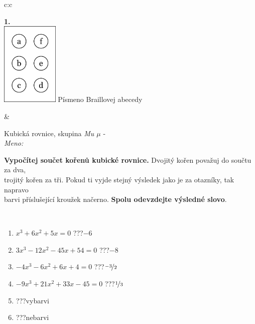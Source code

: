 \documentclass[10pt]{report}
\begin{document}
\begin{tabular}{c:c}
\begin{minipage}[c][104.5mm][t]{0.5\linewidth}
\begin{center}
\begin{minipage}{0.20\linewidth}
\begin{center}
{\Huge\bfseries 1.} \\[2mm]
\includegraphics[height=40mm]{../images/braille.png}
{\small Písmeno Braillovej abecedy}
\end{center}
\end{minipage}
\end{center}
\end{minipage}
&
\begin{minipage}[c][104.5mm][t]{0.5\linewidth}
\begin{center}
\vspace{7mm}
{\huge Kubická rovnice, skupina \textit{Mu $\mu$} -}\\[5mm]
\textit{Meno:}\phantom{xxxxxxxxxxxxxxxxxxxxxxxxxxxxxxxxxxxxxxxxxxxxxxxxxxxxxxxxxxxxxxxxx}\\[5mm]
\begin{minipage}{0.95\linewidth}
\textbf{Vypočítej součet kořenů kubické rovnice.} Dvojitý kořen považuj do součtu za dva,\\trojitý kořen za tři. Pokud ti vyjde stejný výsledek jako je za otazníky, tak napravo\\barvi příslušející kroužek načerno. \textbf{Spolu odevzdejte výsledné slovo}.
\end{minipage}
\\[1mm]
\begin{minipage}{0.79\linewidth}
\begin{center}
\begin{varwidth}{\linewidth}
\begin{enumerate}
\Large
\item $x^3+6x^2+5x=0$\quad \dotfill\; ???\;\dotfill \quad $-6$
\item $3x^3-12x^2-45x+54=0$\quad \dotfill\; ???\;\dotfill \quad $-8$
\item $-4x^3-6x^2+6x+4=0$\quad \dotfill\; ???\;\dotfill \quad $\nicefrac{-3}{2}$
\item $-9x^3+21x^2+33x-45=0$\quad \dotfill\; ???\;\dotfill \quad $\nicefrac{1}{3}$
\item \quad \dotfill\; ???\;\dotfill \quad vybarvi
\item \quad \dotfill\; ???\;\dotfill \quad nebarvi

\end{enumerate}
\end{varwidth}
\end{center}
\end{minipage}
\end{center}
\end{minipage}
\end{tabular}
\end{document}
